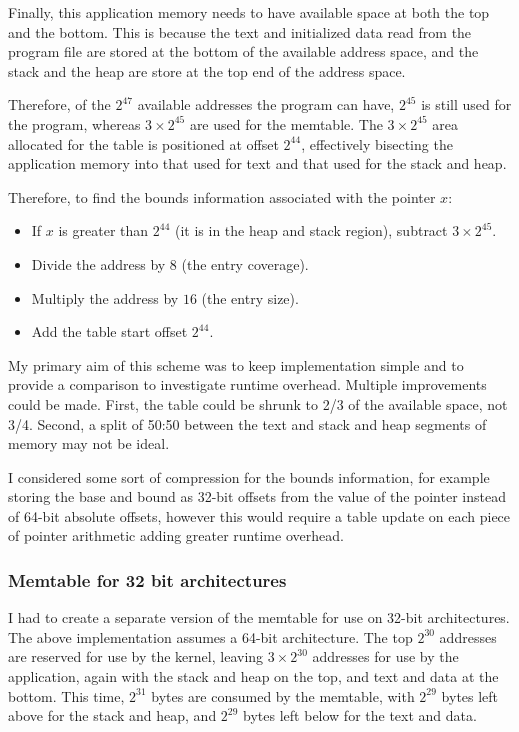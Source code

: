 Finally, this application memory needs to have available space at both the top and the bottom.
This is because the text and initialized data read from the program file are stored at the bottom of the available address space, and the stack and the heap are store at the top end of the address space.

Therefore, of the $2^{47}$ available addresses the program can have, $2^{45}$ is still used for the program, whereas $3\times 2^{45}$ are used for the memtable.
The $3\times 2^{45}$ area allocated for the table is positioned at offset $2^{44}$, effectively bisecting the application memory into that used for text and that used for the stack and heap.

Therefore, to find the bounds information associated with the pointer $x$:

\begin{itemize}
\item If $x$ is greater than $2^{44}$ (it is in the heap and stack region), subtract $3\times 2^{45}$.
\item Divide the address by $8$ (the entry coverage).
\item Multiply the address by $16$ (the entry size).
\item Add the table start offset $2^{44}$.
\end{itemize}

My primary aim of this scheme was to keep implementation simple and to provide a comparison to investigate runtime overhead.
Multiple improvements could be made.
First, the table could be shrunk to 2/3 of the available space, not 3/4.
Second, a split of 50:50 between the text and stack and heap segments of memory may not be ideal.

I considered some sort of compression for the bounds information, for example storing the base and bound as 32-bit offsets from the value of the pointer instead of 64-bit absolute offsets, however this would require a table update on each piece of pointer arithmetic adding greater runtime overhead.

\subsubsection{Memtable for 32 bit architectures}
I had to create a separate version of the memtable for use on 32-bit architectures.
The above implementation assumes a 64-bit architecture.
The top $2^{30}$ addresses are reserved for use by the kernel, leaving $3 \times 2^{30}$ addresses for use by the application, again with the stack and heap on the top, and text and data at the bottom.
This time, $2^{31}$ bytes are consumed by the memtable, with $2^{29}$ bytes left above for the stack and heap, and $2^{29}$ bytes left below for the text and data.
